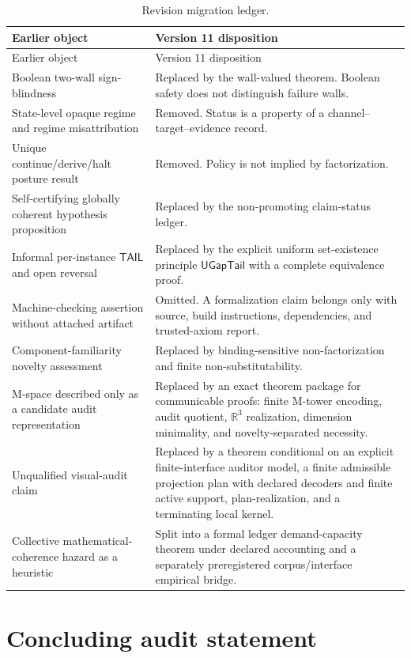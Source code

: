 \documentclass[11pt]{article}
\newcommand{\UGapTail}{\ensuremath{\mathsf{UGapTail}}}
\theoremstyle{plain}
\theoremstyle{definition}
\theoremstyle{remark}
\begin{document}
\begin{longtable}{p{}p{}}
\caption{Revision migration ledger.}\label{tab:migration}\\
\toprule
Earlier object & Version 11 disposition \\
\midrule
\endfirsthead
\toprule
Earlier object & Version 11 disposition \\
\midrule
\endhead
Boolean two-wall sign-blindness & Replaced by the wall-valued theorem.  Boolean safety does not distinguish failure walls. \\
State-level opaque regime and regime misattribution & Removed.  Status is a property of a channel--target--evidence record. \\
Unique continue/derive/halt posture result & Removed.  Policy is not implied by factorization. \\
Self-certifying globally coherent hypothesis proposition & Replaced by the non-promoting claim-status ledger. \\
Informal per-instance $\mathsf{TAIL}$ and open reversal & Replaced by the explicit uniform set-existence principle $\UGapTail$ with a complete equivalence proof. \\
Machine-checking assertion without attached artifact & Omitted.  A formalization claim belongs only with source, build instructions, dependencies, and trusted-axiom report. \\
Component-familiarity novelty assessment & Replaced by binding-sensitive non-factorization and finite non-substitutability. \\
M-space described only as a candidate audit representation & Replaced by an exact theorem package for communicable proofs: finite M-tower encoding, audit quotient, $\mathbb R^3$ realization, dimension minimality, and novelty-separated necessity. \\
Unqualified visual-audit claim & Replaced by a theorem conditional on an explicit finite-interface auditor model, a finite admissible projection plan with declared decoders and finite active support, plan-realization, and a terminating local kernel. \\
Collective mathematical-coherence hazard as a heuristic & Split into a formal ledger demand-capacity theorem under declared accounting and a separately preregistered corpus/interface empirical bridge. \\
\bottomrule
\end{longtable}

\section{Concluding audit statement}
\end{document}
